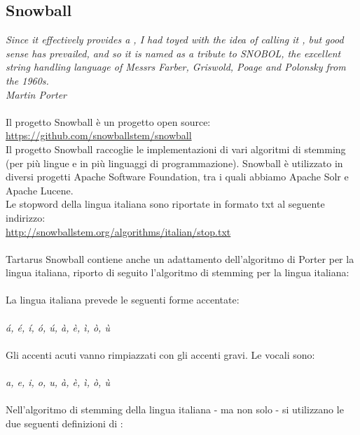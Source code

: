 \documentclass{article}
\theoremstyle{plain}
\theoremstyle{definition}
\begin{document}
\subsection{Snowball}
\textit{
Since it effectively provides a , I had toyed with the idea of calling it , but good sense has prevailed, and so it is  named as a tribute to SNOBOL, the excellent string handling language of Messrs Farber, Griswold, Poage and Polonsky from the 1960s.
\\
Martin Porter
}
\\
\\
Il progetto Snowball è un progetto open source:
\\
\url{https://github.com/snowballstem/snowball}
\\
Il progetto Snowball raccoglie le implementazioni di vari algoritmi di stemming (per più lingue e in più linguaggi di programmazione). Snowball è utilizzato in diversi progetti Apache Software Foundation, tra i quali abbiamo Apache Solr e Apache Lucene.
\\
Le stopword della lingua italiana sono riportate in formato txt al seguente indirizzo:
\\
\url{http://snowballstem.org/algorithms/italian/stop.txt}
\\
\\
Tartarus Snowball contiene anche un adattamento dell'algoritmo di Porter per la lingua italiana, riporto di seguito l'algoritmo di stemming per la lingua italiana:
\\
\\
La lingua italiana prevede le seguenti forme accentate:
\\
\\
\textit{á, é, í, ó, ú, à, è, ì, ò, ù}
\\
\\
Gli accenti acuti vanno rimpiazzati con gli accenti gravi. Le vocali sono:
\\
\\
\textit{a, e, i, o, u, à, è, ì, ò, ù}
\\
\\
Nell'algoritmo di stemming della lingua italiana - ma non solo - si utilizzano le due seguenti definizioni di : 
\end{document}
